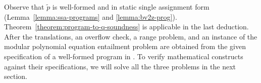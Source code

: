 Observe that $\tilde{p}$ is well-formed and in static single assignment
form (Lemma~\ref{lemma:ssa-programs} and \ref{lemma:bv2z-prog}).
Theorem~\ref{theorem:program-to-q-soundness} is applicable in the last
deduction. After the translations, an overflow check, a range problem, and an instance of the modular
polynomial equation entailment problem are obtained from the given
specification of a well-formed program in \bvdsl.
To verify mathematical constructs against their specifications, we will solve all the three problems in the next section.
